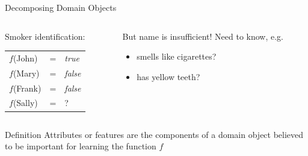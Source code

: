 \documentclass[12pt]{beamer}
\newcommand{\EM}[1]{\mbox{\em#1}}
\begin{document}
\begin{frame}{Decomposing Domain Objects}
	\begin{columns}
		\begin{column}{1.6in}
			Smoker identification: \\
			\smallskip
			\begin{tabular}{lll}
			$f$(John)  & = & \EM{true} \\
			$f$(Mary)  & = & \EM{false} \\
			$f$(Frank) & = & \EM{false} \\
			$f$(Sally) & = & ?
			\end{tabular}
		\end{column}
		\pause
		\begin{column}{2.6in}
			\begin{block}{But name is insufficient!}
				Need to know, e.g.
				\begin{itemize}
					\item smells like cigarettes?
					\item has yellow teeth?
				\end{itemize}
			\end{block}
		\end{column}
	\end{columns}
	\bigskip
	\pause
	\begin{block}{Definition}
		\alert{Attributes} or \alert{features} are the components of a domain object believed to be important for learning the function $f$
	\end{block}
\end{frame}
\end{document}
